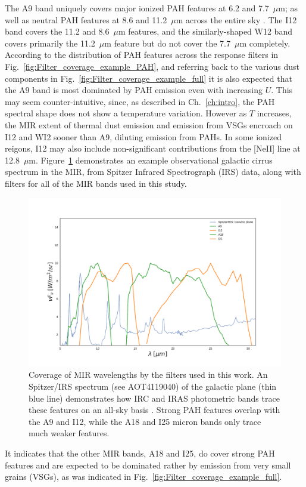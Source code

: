          The A9 band uniquely covers major ionized PAH features at 6.2 and 7.7~$\mu$m; as well as neutral PAH features at 8.6 and 11.2~$\mu$m across the entire sky \citep{irc07}. The I12 band covers the 11.2 and 8.6~$\mu$m features, and the similarly-shaped W12 band covers primarily the 11.2~$\mu{}$m feature but do not cover the 7.7~$\mu{}$m completely. According to the distribution of PAH features across the response filters in Fig.~\ref{fig:Filter_coverage_example_PAH}, and referring back to the various dust components in Fig.~\ref{fig:Filter_coverage_example_full} it is also expected that the A9 band is most dominated by PAH emission even with increasing $U$. This may seem counter-intuitive, since, as described in Ch.~\ref{ch:intro}, the PAH spectral shape does not show a temperature variation. However as $T$ increases, the MIR extent of thermal dust emission and emission from VSGs encroach on I12 and WI2 sooner than A9, diluting emission from PAHs. In some ionized reigons, I12 may also include non-significant contributions from the [NeII] line at 12.8~$\mu$m. Figure~\ref{fig:Filter_coverage_example_MIR} demonstrates an example observational galactic cirrus spectrum in the MIR, from Spitzer Infrared Spectrograph (IRS) \citep{spitzer04} data, along with filters for all of the MIR bands used in this study.
             \begin{figure}
               \centering
               \includegraphics[width=\textwidth]{../Plots/ch_datasources/Filter_coverage_example_MIR.pdf}
               \caption{Coverage of MIR wavelengths by the filters used in this work. An Spitzer/IRS spectrum (see AOT4119040) of the galactic plane (thin blue line) demonstrates how IRC and IRAS photometric bands trace these features on an all-sky basis \citep{ishihara07}. Strong PAH features overlap with the A9 and I12, while the A18 and I25 micron bands only trace much weaker features. }
               \label{fig:Filter_coverage_example_MIR}
             \end{figure}
         It indicates that the other MIR bands, A18 and I25, do cover strong PAH features and are expected to be dominated rather by emission from very small grains (VSGs), as was indicated in Fig.~\ref{fig:Filter_coverage_example_full}.

